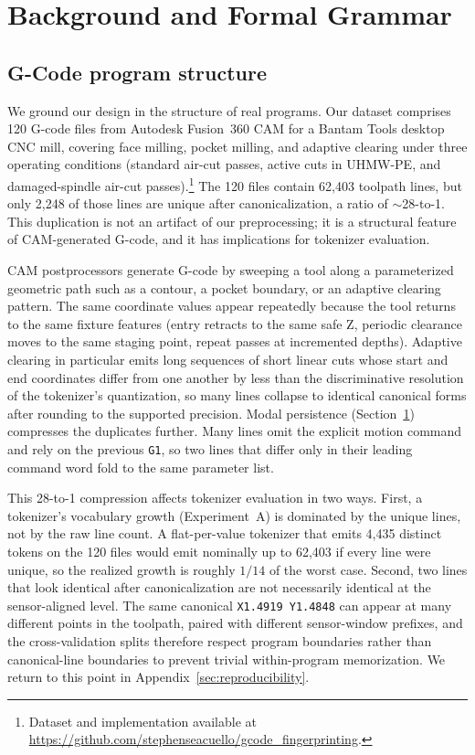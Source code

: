 \documentclass[sensors,article,submit,moreauthors,pdftex]{Definitions/mdpi}
\begin{document}
\section{Background and Formal Grammar}
\label{sec:anatomy}

\subsection{G-Code program structure}
\label{sec:program_structure}

We ground our design in the structure of real programs. Our dataset comprises 120 G-code files from Autodesk Fusion~360 CAM for a Bantam Tools desktop CNC mill, covering face milling, pocket milling, and adaptive clearing under three operating conditions (standard air-cut passes, active cuts in UHMW-PE, and damaged-spindle air-cut passes).\footnote{Dataset and implementation available at \url{https://github.com/stephenseacuello/gcode\_fingerprinting}.} The 120 files contain 62{,}403 toolpath lines, but only 2{,}248 of those lines are unique after canonicalization, a ratio of $\sim$28-to-1. This duplication is not an artifact of our preprocessing; it is a structural feature of CAM-generated G-code, and it has implications for tokenizer evaluation.

CAM postprocessors generate G-code by sweeping a tool along a parameterized geometric path such as a contour, a pocket boundary, or an adaptive clearing pattern. The same coordinate values appear repeatedly because the tool returns to the same fixture features (entry retracts to the same safe Z, periodic clearance moves to the same staging point, repeat passes at incremented depths). Adaptive clearing in particular emits long sequences of short linear cuts whose start and end coordinates differ from one another by less than the discriminative resolution of the tokenizer's quantization, so many lines collapse to identical canonical forms after rounding to the supported precision. Modal persistence (Section~\ref{sec:anatomy}) compresses the duplicates further. Many lines omit the explicit motion command and rely on the previous \texttt{G1}, so two lines that differ only in their leading command word fold to the same parameter list.

This 28-to-1 compression affects tokenizer evaluation in two ways. First, a tokenizer's vocabulary growth (Experiment~A) is dominated by the unique lines, not by the raw line count. A flat-per-value tokenizer that emits 4{,}435 distinct tokens on the 120 files would emit nominally up to 62{,}403 if every line were unique, so the realized growth is roughly $1/14$ of the worst case. Second, two lines that look identical after canonicalization are not necessarily identical at the sensor-aligned level. The same canonical \texttt{X1.4919 Y1.4848} can appear at many different points in the toolpath, paired with different sensor-window prefixes, and the cross-validation splits therefore respect program boundaries rather than canonical-line boundaries to prevent trivial within-program memorization. We return to this point in Appendix~\ref{sec:reproducibility}.
\end{document}
